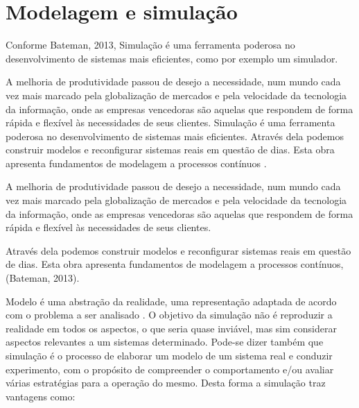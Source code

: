 \documentclass[12pt]{article}
\begin{document}
  \section{Modelagem e simulação}
  
  Conforme Bateman, 2013, Simulação é uma ferramenta poderosa no 
  desenvolvimento de sistemas mais eficientes, como por exemplo um simulador.
  
  A melhoria de produtividade passou de desejo a necessidade, num mundo cada 
  vez mais marcado pela globalização de mercados e pela velocidade da
  tecnologia da informação, onde as empresas vencedoras são aquelas que
  respondem de forma rápida e flexível às necessidades de seus clientes.
  Simulação é uma ferramenta poderosa no desenvolvimento de sistemas mais
  eficientes. Através dela podemos construir modelos e reconfigurar
  sistemas reais em questão de dias. Esta obra apresenta fundamentos de
  modelagem a processos contínuos \cite{Bateman:13}.
  
  A melhoria de produtividade passou de desejo a necessidade, num mundo 
  cada vez mais marcado pela globalização de mercados e pela velocidade
  da tecnologia da informação, onde as empresas vencedoras são aquelas
  que respondem de forma rápida e flexível às necessidades de seus clientes. 
  
  
  Através dela podemos construir modelos e reconfigurar sistemas
  reais em questão de dias. Esta obra apresenta fundamentos de modelagem 
  a processos contínuos, (Bateman, 2013).
  
  
  Modelo é uma abstração da realidade, uma representação adaptada de acordo
  com o problema a ser analisado . O objetivo da simulação não é reproduzir
  a realidade em todos os aspectos, o que seria quase inviável, mas sim 
  considerar aspectos relevantes a um sistemas determinado. Pode-se dizer
  também que simulação é o processo de elaborar um modelo de um sistema
  real e conduzir experimento, com o propósito de compreender o comportamento
  e/ou avaliar várias estratégias para a operação do mesmo. Desta forma a
  simulação traz vantagens como:
  
  
  
\end{document}

